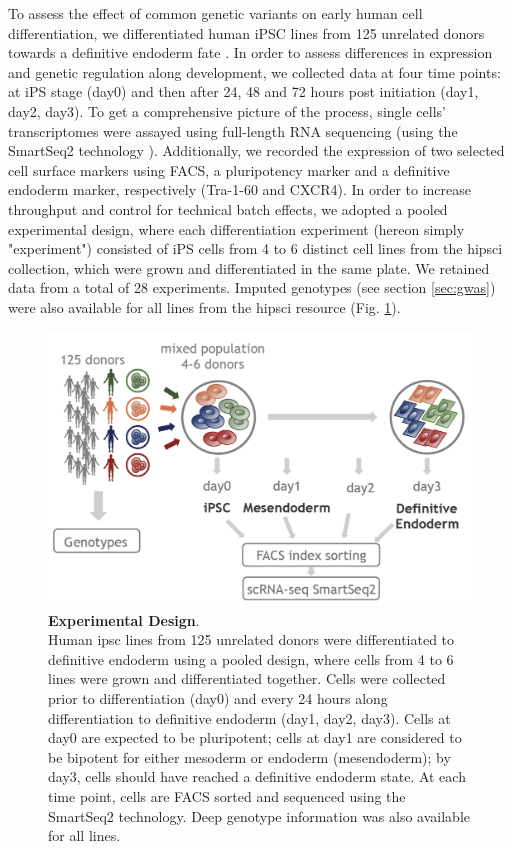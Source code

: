 To assess the effect of common genetic variants on early human cell differentiation, we differentiated human iPSC lines from 125 unrelated donors towards a definitive endoderm fate \cite{hannan2013production}.
In order to assess differences in expression and genetic regulation along development, we collected data at four 
time points: at iPS stage (day0) and then after 24, 48 and 72 hours post initiation (day1, day2, day3).
To get a comprehensive picture of the process, single cells' transcriptomes were assayed using full-length RNA sequencing (using the SmartSeq2 technology \cite{picelli2013smart}).
Additionally, we recorded the expression of two selected cell surface markers using FACS, a pluripotency marker and a definitive endoderm marker, respectively (Tra-1-60 and CXCR4).
In order to increase throughput and control for technical batch effects, we adopted a pooled experimental design, where each differentiation experiment (hereon simply "experiment") consisted of iPS cells from 4 to 6 distinct cell lines from the \gls{hipsci} collection, which were grown and differentiated in the same plate.
We retained data from a total of 28 experiments.
Imputed genotypes (see section \ref{sec:gwas}) were also available for all lines from the \gls{hipsci} resource (Fig. \ref{fig:endodiff_experimental_design}).

\begin{figure}[h]
\centering
\includegraphics[width=12cm]{Chapter4/Fig/endodiff_experimental_design.png}
\caption[Experimental Design]{\textbf{Experimental Design}.\\
Human \gls{ipsc} lines from 125 unrelated donors were differentiated to definitive endoderm using a pooled design, where cells from 4 to 6 lines were grown and differentiated together.
Cells were collected prior to differentiation (day0) and every 24 hours along differentiation to definitive endoderm (day1, day2, day3).
Cells at day0 are expected to be pluripotent; cells at day1 are considered to be bipotent for either mesoderm or endoderm (mesendoderm); by day3, cells should have reached a definitive endoderm state.
At each time point, cells are FACS sorted and sequenced using the SmartSeq2 technology.
Deep genotype information was also available for all lines.}
\label{fig:endodiff_experimental_design}
\end{figure}

